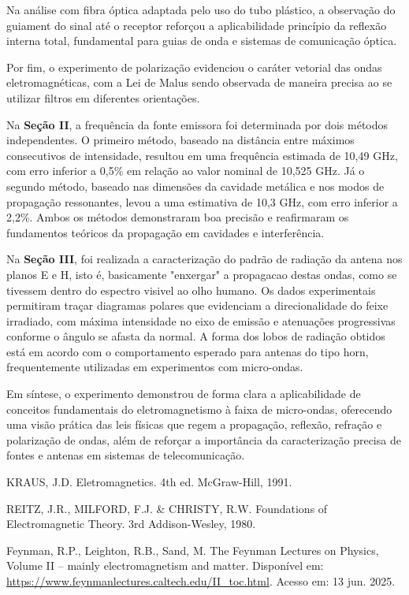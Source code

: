 \documentclass[12pt]{article}
\begin{document}
Na análise com fibra óptica
adaptada pelo uso do tubo plástico, a observação do guiament do sinal
até o receptor reforçou a aplicabilidade
princípio da reflexão interna total, fundamental para guias de onda e
sistemas de comunicação óptica.

Por fim, o experimento de polarização
evidenciou o caráter vetorial das ondas eletromagnéticas, com a Lei
de Malus sendo observada de maneira precisa ao se utilizar filtros em
diferentes orientações.

Na \textbf{Seção II}, a frequência da fonte emissora foi determinada
por dois métodos independentes. O primeiro método, baseado na
distância entre máximos consecutivos de intensidade, resultou em uma
frequência estimada de 10{,}49 GHz, com erro inferior a 0,5\% em
relação ao valor nominal de 10{,}525 GHz. Já o segundo método,
baseado nas dimensões da cavidade metálica e nos modos de propagação
ressonantes, levou a uma estimativa de 10{,}3 GHz, com erro inferior
a 2{,}2\%. Ambos os métodos demonstraram boa precisão e reafirmaram
os fundamentos teóricos da propagação em cavidades e interferência.

Na \textbf{Seção III}, foi realizada a caracterização do padrão de
radiação da antena nos planos E e H, isto é, basicamente "enxergar" a
propagacao destas ondas, como se tivessem dentro do espectro visivel
ao olho humano. Os dados experimentais
permitiram traçar diagramas polares que evidenciam a direcionalidade
do feixe irradiado, com máxima intensidade no eixo de emissão e
atenuações progressivas conforme o ângulo se afasta da normal. A
forma dos lobos de radiação obtidos está em acordo com o
comportamento esperado para antenas do tipo horn, frequentemente
utilizadas em experimentos com micro-ondas.

Em síntese, o experimento demonstrou de forma clara a aplicabilidade
de conceitos fundamentais do eletromagnetismo à faixa de micro-ondas,
oferecendo uma visão prática das leis físicas que regem a propagação,
reflexão, refração e polarização de ondas, além de reforçar a
importância da caracterização precisa de fontes e antenas em sistemas
de telecomunicação.

\clearpage
\begin{thebibliography}{9}
  KRAUS, J.D. Eletromagnetics. 4th ed. McGraw-Hill, 1991.

  REITZ, J.R., MILFORD, F.J. \& CHRISTY, R.W. Foundations of
  Electromagnetic Theory. 3rd Addison-Wesley, 1980.

  Feynman, R.P., Leighton, R.B., Sand, M. The Feynman Lectures on
  Physics, Volume II – mainly electromagnetism and matter. Disponível
  em: \url{https://www.feynmanlectures.caltech.edu/II_toc.html}.
  Acesso em: 13 jun. 2025.
\end{thebibliography}
\end{document}
